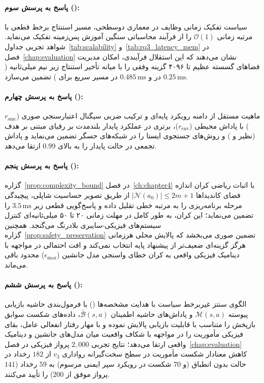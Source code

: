 \documentclass[oneside,openany,phd]{TMU-Thesis}
\begin{document}
\paragraph{پاسخ به پرسش سوم ():} سیاست تفکیک زمانی وظایف در معماری دوسطحی، مسیر استنتاج برخط قطعی با مرتبه زمانی $\mathcal{O}(1)$ را از فرآیند محاسباتی سنگین آموزش پس‌زمینه تفکیک می‌نماید. شواهد تجربی جداول~\ref{tab:scalability} و~\ref{tab:rq3_latency_mem} در فصل~\ref{chap:evaluation} نشان می‌دهند که این استقلال فرآیندی، امکان مدیریت فضاهای گسسته عظیم تا ۴۰۹۶ گزینه وفقی را با میانه تأخیر استنتاج زیر نیم میلی‌ثانیه ($0.25\,\text{ms}$ در  و $0.485\,\text{ms}$ در مسیر سریع  برای \rsdrlplus) تضمین می‌سازد.

\paragraph{پاسخ به پرسش چهارم ():} ماهیت مستقل از دامنه رویکرد پایه‌ای و ترکیب ضربی سیگنال اعتبارسنجی صوری  ($r_{\text{smc}}$) با پاداش محیطی ($r_{\text{env}}$)، برتری در عملکرد پایدار بلندمدت بر رقبای مبتنی بر هدف (نظیر  و ) و روش‌های جستجوی ایستا را در شبکه‌های حسگر تضمین می‌نماید و پاداش تجمعی در حالت پایدار را به بالای $0.99$ ارتقا می‌دهد.

\paragraph{پاسخ به پرسش پنجم ():} گزاره~\ref{prop:complexity_bound} در فصل~\ref{ch:chapter4} با اثبات ریاضی کران اندازه فضای کاندیداها $|\mathcal{N}(a_0)| \le 2m + 1$ از طریق تصویر حساسیت شاپلی، پیچیدگی مرحله برنامه‌ریزی را به مرتبه خطی تقلیل داده و پاسخ‌گویی قطعی زیر $3.5\,\text{ms}$ را تضمین می‌نماید؛ این کران، به طور کامل در مهلت زمانی ۲۰ تا ۵۰ میلی‌ثانیه‌ای کنترل سیستم‌های فیزیکی-سایبری بلادرنگ می‌گنجد. همچنین گزاره~\ref{prop:safety_preservation} تضمین صوری می‌بخشد که پالایش محلی هرزمانی هرگز گزینه‌ای ضعیف‌تر از پیشنهاد پایه انتخاب نمی‌کند و افت احتمالی در مواجهه با دینامیک فیزیکی واقعی به کران خطای واسنجی مدل جانشین ($\epsilon_{\max}$) محدود باقی می‌ماند.

\paragraph{پاسخ به پرسش ششم ():} الگوی سنتز غیربرخط سیاست با هدایت مشخصه‌ها (\sgos) با فرمول‌بندی حاشیه بازیابی پیوسته $\mathcal{M}(s, a)$ و پاداش‌های حاشیه اطمینان $\bar{\mathcal{B}}(s, a)$، داده‌های شکست سوابق بازپخش را متناسب با قابلیت بازیابی پالایش نموده و با مهار رفتار انفعالی عامل، بقای فیزیکی مأموریت را در مواجهه با شکاف واقعیت میان مدل‌های جانشین و دینامیک واقعی ارتقا می‌دهد؛ نتایج تجربی $2{,}000$ پرواز فیزیکی در فصل~\ref{chap:evaluation} کاهش معنادار شکست مأموریت در سطح سخت‌گیرانه رواداری $v_3$ از $182$ رخداد در حالت بدون انطباق (و $70$ شکست در رویکرد سپر ایمنی مرسوم) به $59$ رخداد ($141$ پرواز موفق از $200$) را تأیید می‌کنند.
\end{document}
